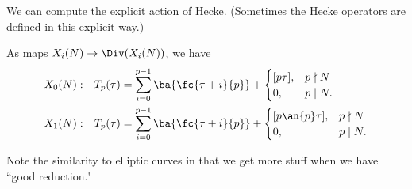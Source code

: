 

We can compute the explicit action of Hecke. (Sometimes the Hecke operators are defined in this explicit way.)

\begin{pr}
As maps $X_i(N)\to \Div(X_i(N))$, we have
\begin{align}
X_0(N): && T_p(\tau) & = \sum_{i=0}^{p-1} \ba{\fc{\tau+i}{p}}+\begin{cases}
[p\tau],&p\nmid N\\
0,&p\mid N.
\end{cases}\label{eq:Tp-X0}\\
X_1(N): && T_p(\tau) & = \sum_{i=0}^{p-1} \ba{\fc{\tau+i}{p}}+\begin{cases}
[p\an{p}\tau],&p\nmid N\\
0,&p\mid N.
\end{cases}
\label{eq:Tp-X1}
\end{align}
\end{pr}
Note the similarity to elliptic curves in that we get more stuff when we have ``good reduction."


